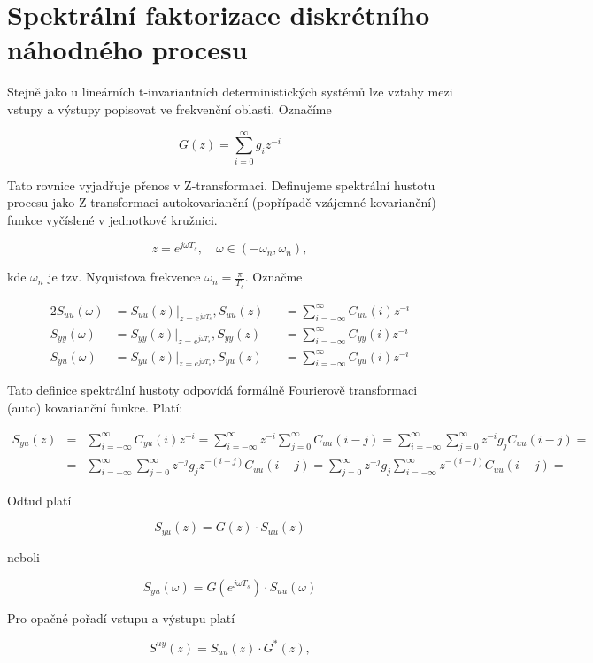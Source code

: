\chapter{Spektrální faktorizace diskrétního náhodného procesu}
Stejně jako u lineárních t-invariantních deterministických systémů lze vztahy mezi vstupy a výstupy popisovat ve frekvenční oblasti. Označíme

\[ G(z) = \sum_{i=0}^\infty g_iz^{-i} \]

Tato rovnice vyjadřuje přenos v Z-transformaci. Definujeme spektrální hustotu procesu jako Z-transformaci autokovarianční (popřípadě vzájemné kovarianční) funkce vyčíslené v jednotkové kružnici.

\[ z=e^{j\omega T_s},\quad \omega\in(-\omega_n,\omega_n), \]

kde $\omega_n$ je tzv. Nyquistova frekvence $\omega_n = \frac{\pi}{T_s}$. Označme

\begin{alignat*}{2}
S_{uu}(\omega) & = S_{uu}(z)|_{z=e^{j\omega T_s}}, S_{uu}(z) && = \sum_{i=-\infty}^\infty C_{uu}(i)z^{-i}\\
S_{yy}(\omega) & = S_{yy}(z)|_{z=e^{j\omega T_s}}, S_{yy}(z) && = \sum_{i=-\infty}^\infty C_{yy}(i)z^{-i}\\
S_{yu}(\omega) & = S_{yu}(z)|_{z=e^{j\omega T_s}}, S_{yu}(z) && = \sum_{i=-\infty}^\infty C_{yu}(i)z^{-i}
\end{alignat*}

Tato definice spektrální hustoty odpovídá formálně Fourierově transformaci (auto) kovarianční funkce. Platí:

\begin{eqnarray*}
S_{yu}(z) & = & \sum_{i=-\infty}^\infty C_{yu}(i)z^{-i} = \sum_{i=-\infty}^\infty z^{-i} \sum_{j=0}^\infty C_{uu}(i-j) = \sum_{i=-\infty}^\infty \sum_{j=0}^\infty z^{-i} g_j C_{uu}(i-j) = \\
& = & \sum_{i=-\infty}^\infty \sum_{j=0}^\infty z^{-j} g_j z^{-(i-j)} C_{uu}(i-j) = \sum_{j=0}^\infty z^{-j}g_j \sum_{i=-\infty}^\infty z^{-(i-j)} C_{uu}(i-j) =
\end{eqnarray*}

Odtud platí

\[ S_{yu}(z) = G(z)\cdot S_{uu}(z) \]

neboli

\[ S_{yu}(\omega) = G\left(e^{j\omega T_s}\right)\cdot S_{uu}(\omega) \]

Pro opačné pořadí vstupu a výstupu platí

\[ S^{uy}(z) = S_{uu}(z)\cdot G^*(z), \]

